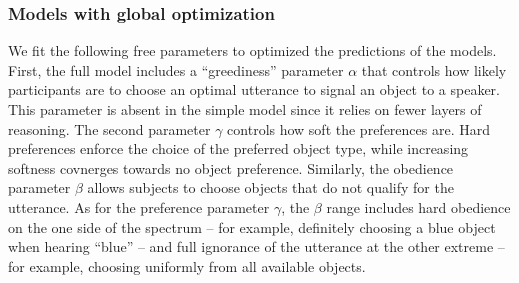 \documentclass[10pt,a4paper]{article}
\begin{document}
\subsubsection*{Models with global optimization}

We fit the following free parameters to optimized the predictions of the models. First, the full model includes a ``greediness'' parameter $\alpha$ that controls how likely participants are to choose an optimal utterance to signal an object to a speaker. This parameter is absent in the simple model since it relies on fewer layers of reasoning. The second parameter $\gamma$ controls how soft the preferences are. 
Hard preferences enforce the choice of the preferred object type, while increasing softness covnerges towards no object preference. 
Similarly, the obedience parameter $\beta$ allows subjects to choose objects that do not qualify for the utterance. 
As for the preference parameter $\gamma$, the $\beta$ range includes hard obedience on the one side of the spectrum -- for example, definitely choosing a blue object when hearing ``blue'' -- and full ignorance of the utterance at the other extreme -- for example, choosing uniformly from all available objects. 
\end{document}

